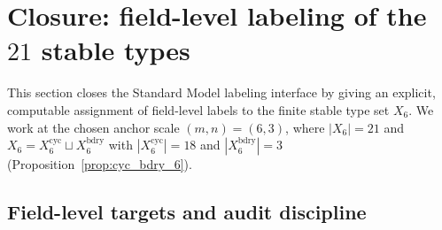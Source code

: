 \section{Closure: field-level labeling of the \texorpdfstring{$21$}{21} stable types}
\label{sec:sm_labeling_closure}

This section closes the Standard Model labeling interface by giving an explicit, computable assignment of field-level labels to the finite stable type set $X_6$.
We work at the chosen anchor scale $(m,n)=(6,3)$, where $|X_6|=21$ and $X_6=X_6^{\mathrm{cyc}}\sqcup X_6^{\mathrm{bdry}}$ with $|X_6^{\mathrm{cyc}}|=18$ and $|X_6^{\mathrm{bdry}}|=3$ (Proposition~\ref{prop:cyc_bdry_6}).

\subsection{Field-level targets and audit discipline}
\label{subsec:sm_labeling_targets}

